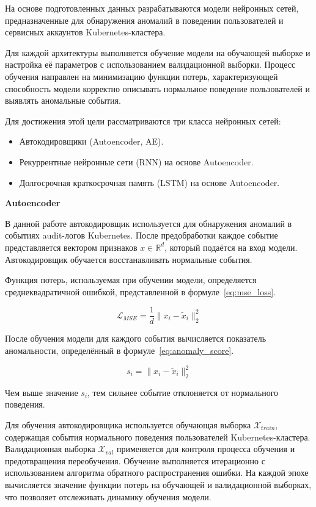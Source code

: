 На основе подготовленных данных разрабатываются модели нейронных сетей, предназначенные для обнаружения аномалий в поведении пользователей и сервисных аккаунтов Kubernetes-кластера.

Для каждой архитектуры выполняется обучение модели на обучающей выборке и настройка её параметров с использованием валидационной выборки. Процесс обучения направлен на минимизацию функции потерь, характеризующей способность модели корректно описывать нормальное поведение пользователей и выявлять аномальные события.

Для достижения этой цели рассматриваются три класса нейронных сетей:

\begin{itemize}
    \item Автокодировщики (Autoencoder, AE).
    \item Рекуррентные нейронные сети (RNN) на основе Autoencoder.
    \item Долгосрочная краткосрочная память (LSTM) на основе Autoencoder.
\end{itemize}

\textbf{Autoencoder}

В данной работе автокодировщик используется для обнаружения аномалий в событиях audit-логов Kubernetes. После предобработки каждое событие представляется вектором признаков $x \in \mathbb{R}^d$, который подаётся на вход модели. Автокодировщик обучается восстанавливать нормальные события.

Функция потерь, используемая при обучении модели, определяется среднеквадратичной ошибкой, представленной в формуле~\ref{eq:mse_loss}.

\begin{equation}\label{eq:mse_loss}
    \mathcal{L}_{MSE} = \frac{1}{d} \| x_i - \tilde{x}_i \|_2^2
\end{equation}

После обучения модели для каждого события вычисляется показатель аномальности, определённый в формуле~\ref{eq:anomaly_score}.

\begin{equation}\label{eq:anomaly_score}
    s_i = \| x_i - \tilde{x}_i \|_2^2
\end{equation}

Чем выше значение $s_i$, тем сильнее событие отклоняется от нормального поведения.

Для обучения автокодировщика используется обучающая выборка $\mathcal{X}_{train}$, содержащая события нормального поведения пользователей Kubernetes-кластера. Валидационная выборка $\mathcal{X}_{val}$ применяется для контроля процесса обучения и предотвращения переобучения. Обучение выполняется итерационно с использованием алгоритма обратного распространения ошибки. На каждой эпохе вычисляется значение функции потерь на обучающей и валидационной выборках, что позволяет отслеживать динамику обучения модели.

